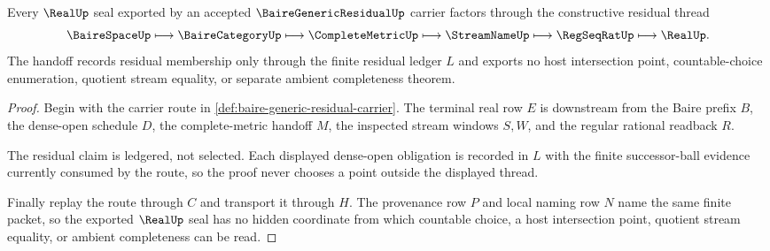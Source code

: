 \begin{theorem}
\label{thm:baire-generic-residual-thread-handoff}
Every $\RealUp$ seal exported by an accepted $\BaireGenericResidualUp$ carrier factors through the constructive residual thread
$$
\BaireSpaceUp
\longmapsto
\BaireCategoryUp
\longmapsto
\CompleteMetricUp
\longmapsto
\StreamNameUp
\longmapsto
\RegSeqRatUp
\longmapsto
\RealUp .
$$
The handoff records residual membership only through the finite residual ledger $L$ and exports no host intersection point, countable-choice enumeration, quotient stream equality, or separate ambient completeness theorem.
\end{theorem}
\begin{proof}
Begin with the carrier route in \autoref{def:baire-generic-residual-carrier}. The terminal real row $E$ is downstream from the Baire prefix $B$, the dense-open schedule $D$, the complete-metric handoff $M$, the inspected stream windows $S,W$, and the regular rational readback $R$.

The residual claim is ledgered, not selected. Each displayed dense-open obligation is recorded in $L$ with the finite successor-ball evidence currently consumed by the route, so the proof never chooses a point outside the displayed thread.

Finally replay the route through $C$ and transport it through $H$. The provenance row $P$ and local naming row $N$ name the same finite packet, so the exported $\RealUp$ seal has no hidden coordinate from which countable choice, a host intersection point, quotient stream equality, or ambient completeness can be read.
\end{proof}


\begin{closurestatus}{\BaireGenericResidualUp}
  \theoryclosure{\seedClosure}
  \formalstatus{\unformalizedV}
\end{closurestatus}
